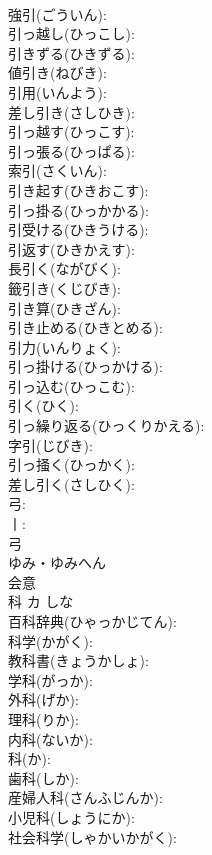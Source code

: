 \documentclass[8pt]{extreport}
\begin{document}
\begin{CJK}{UTF8}{min}
\\	強引(ごういん): 
\\	引っ越し(ひっこし): 
\\	引きずる(ひきずる): 
\\	値引き(ねびき): 
\\	引用(いんよう): 
\\	差し引き(さしひき): 
\\	引っ越す(ひっこす): 
\\	引っ張る(ひっぱる): 
\\	索引(さくいん): 
\\	引き起す(ひきおこす): 
\\	引っ掛る(ひっかかる): 
\\	引受ける(ひきうける): 
\\	引返す(ひきかえす): 
\\	長引く(ながびく): 
\\	籤引き(くじびき): 
\\	引き算(ひきざん): 
\\	引き止める(ひきとめる): 
\\	引力(いんりょく): 
\\	引っ掛ける(ひっかける): 
\\	引っ込む(ひっこむ): 
\\	引く(ひく): 
\\	引っ繰り返る(ひっくりかえる): 
\\	字引(じびき): 
\\	引っ掻く(ひっかく): 
\\	差し引く(さしひく): 
\\	弓: 
\\	丨: 
\\	弓	
\\	ゆみ・ゆみへん	
\\	会意 
\\	科	カ		しな	
\\	百科辞典(ひゃっかじてん): 
\\	科学(かがく): 
\\	教科書(きょうかしょ): 
\\	学科(がっか): 
\\	外科(げか): 
\\	理科(りか): 
\\	内科(ないか): 
\\	科(か): 
\\	歯科(しか): 
\\	産婦人科(さんふじんか): 
\\	小児科(しょうにか): 
\\	社会科学(しゃかいかがく): 

\end{CJK}
\end{document}
